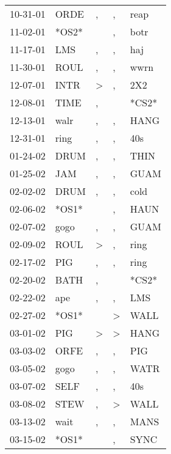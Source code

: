 \begin{supertabular}{lllll}
 10-31-01 &   ORDE &                , &             , &   reap \\
 11-02-01 &  *OS2* &                  &             , &   botr \\
 11-17-01 &    LMS &                , &             , &    haj \\
 11-30-01 &   ROUL &                , &             , &   wwrn \\
 12-07-01 &   INTR &     \textgreater &             , &    2X2 \\
 12-08-01 &   TIME &                , &               &  *CS2* \\
 12-13-01 &   walr &                , &             , &   HANG \\
 12-31-01 &   ring &                , &             , &    40s \\
 01-24-02 &   DRUM &                , &             , &   THIN \\
 01-25-02 &    JAM &                , &             , &   GUAM \\
 02-02-02 &   DRUM &                , &             , &   cold \\
 02-06-02 &  *OS1* &                  &             , &   HAUN \\
 02-07-02 &   gogo &                , &             , &   GUAM \\
 02-09-02 &   ROUL &     \textgreater &             , &   ring \\
 02-17-02 &    PIG &                , &             , &   ring \\
 02-20-02 &   BATH &                , &               &  *CS2* \\
 02-22-02 &    ape &                , &             , &    LMS \\
 02-27-02 &  *OS1* &                  &  \textgreater &   WALL \\
 03-01-02 &    PIG &     \textgreater &  \textgreater &   HANG \\
 03-03-02 &   ORFE &                , &             , &    PIG \\
 03-05-02 &   gogo &                , &             , &   WATR \\
 03-07-02 &   SELF &                , &             , &    40s \\
 03-08-02 &   STEW &                , &  \textgreater &   WALL \\
 03-13-02 &   wait &                , &             , &   MANS \\
 03-15-02 &  *OS1* &                  &             , &   SYNC \\

\end{supertabular}
